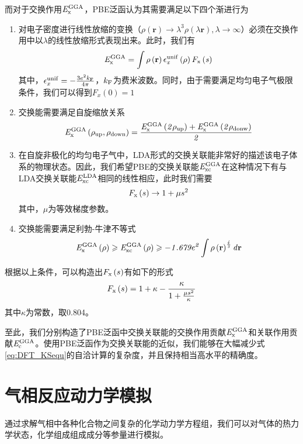 而对于交换作用$\it E_{\rm x}^{\rm GGA} \it$，PBE泛函认为其需要满足以下四个渐进行为\chinesecolon
\begin{enumerate}[label=（\arabic*）,wide]
    \item 对电子密度进行线性放缩的变换（$\rho\left({\bm r}\right)\rightarrow \lambda^3\rho(\lambda {\bm r}), \lambda\rightarrow \infty$）必须在交换作用中以$\lambda$的线性放缩形式表现出来。此时，我们有\chinesecolon
    \[
        \it E_{\rm x}^{\rm GGA} \it=\int\rho\left({\mathbf r}\right)\epsilon_x^{\rm unif}\left(\rho\right)F_{\rm x}\left(s\right)
    \]
    其中，$\epsilon_x^{\rm unif}=-\frac{3e^2k_{\rm F}}{4\pi}$，$k_{\rm F}$为费米波数。同时，由于需要满足均匀电子气极限条件，我们可以得到$F_{x}\left(0\right)=1$
    \item 交换能需要满足自旋缩放关系\chinesecolon
    \[
        \it E_{\rm x}^{\rm GGA} \it\left(\rho_{\rm up},\rho_{\rm down}\right)=\frac{\it E_{\rm x}^{\rm GGA} \it\left(2\rho_{\rm up}\right)+\it E_{\rm x}^{\rm GGA} \it\left(2\rho_{\rm donw}\right)}{2}
    \]
    \item 在自旋非极化的均匀电子气中，LDA形式的交换关联能非常好的描述该电子体系的物理状态。因此，我们希望PBE的交换关联能$\it E_{\rm xc}^{\rm GGA} \it$在这种情况下有与LDA交换关联能$\it E_{\rm xc}^{\rm LDA} \it$相同的线性相应，此时我们需要\chinesecolon
    \[
        F_{\rm x}\left(s\right)\rightarrow 1+\mu s^2
    \]
    其中，$\mu$为等效梯度参数。
    \item 交换能需要满足利勃-牛津不等式\chinesecolon
    \[
        \it E_{\rm x}^{\rm GGA} \it\left(\rho\right)\geqslant\it E_{\rm xc}^{\rm GGA} \it\left(\rho\right)\geqslant -1.679e^2\int \rho\left({\mathbf r}\right)^{\frac{4}{3}} d{\mathbf r}
    \]
\end{enumerate}

根据以上条件，可以构造出$F_{\rm x}\left(s\right)$有如下的形式\chinesecolon
\begin{equation}
    F_{\rm x}\left(s\right)=1+\kappa -\frac{\kappa }{1+\frac{\mu s^2}{\kappa}}
\end{equation}
其中$\kappa$为常数，取0.804。

至此，我们分别构造了PBE泛函中交换关联能的交换作用贡献$\it E_{\rm x}^{\rm GGA} \it$和关联作用贡献$\it E_{\rm c}^{\rm GGA} \it$。使用PBE泛函作为交换关联能的近似，我们能够在大幅减少式\ref{eq:DFT_KSequ}的自洽计算的复杂度，并且保持相当高水平的精确度。
\section{气相反应动力学模拟}
通过求解气相中各种化合物之间复杂的化学动力学方程组，我们可以对气体的热力学状态，化学组成组成成分等参量进行模拟。

